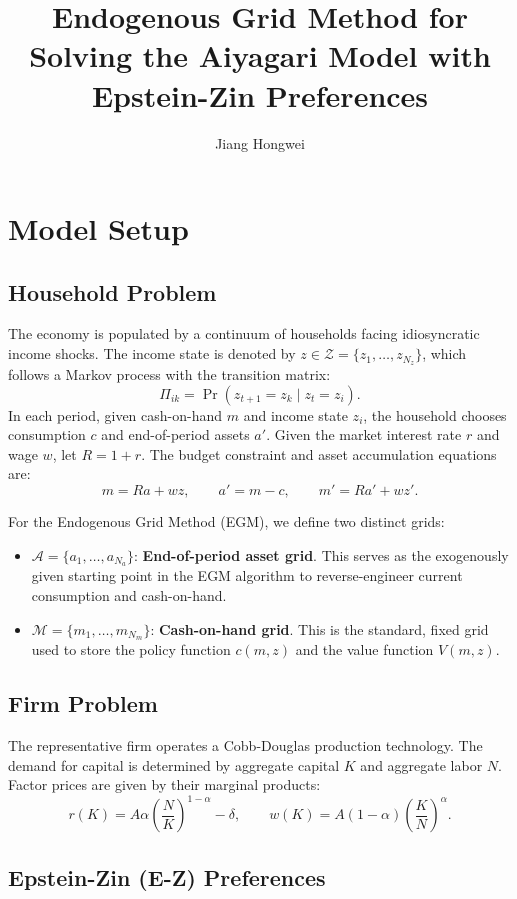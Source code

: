 \documentclass[a4paper,12pt]{article}
\title{Endogenous Grid Method for Solving the Aiyagari Model with Epstein-Zin Preferences}
\author{Jiang Hongwei}
\date{}
\newcommand{\Agrid}{\mathcal{A}}
\newcommand{\Mgrid}{\mathcal{M}}
\newcommand{\Zgrid}{\mathcal{Z}}
\begin{document}
\maketitle

\section{Model Setup}

\subsection{Household Problem}

The economy is populated by a continuum of households facing idiosyncratic income shocks. The income state is denoted by $z\in\Zgrid=\{z_1,\ldots,z_{N_z}\}$, which follows a Markov process with the transition matrix:
\[
    \Pi_{ik}=\Pr(z_{t+1}=z_k\mid z_t=z_i).
\]
In each period, given cash-on-hand $m$ and income state $z_i$, the household chooses consumption $c$ and end-of-period assets $a'$. Given the market interest rate $r$ and wage $w$, let $R=1+r$. The budget constraint and asset accumulation equations are:
\[
    m = R a + w z, \qquad a' = m - c, \qquad m' = R a' + w z'.
\]

For the Endogenous Grid Method (EGM), we define two distinct grids:
\begin{itemize}
    \item $\Agrid=\{a_1,\ldots,a_{N_a}\}$: \textbf{End-of-period asset grid}. This serves as the exogenously given starting point in the EGM algorithm to reverse-engineer current consumption and cash-on-hand.
    \item $\Mgrid=\{m_1,\ldots,m_{N_m}\}$: \textbf{Cash-on-hand grid}. This is the standard, fixed grid used to store the policy function $c(m,z)$ and the value function $V(m,z)$.
\end{itemize}

\subsection{Firm Problem}

The representative firm operates a Cobb-Douglas production technology. The demand for capital is determined by aggregate capital $K$ and aggregate labor $N$. Factor prices are given by their marginal products:
\[
    r(K)=A\alpha\left(\frac{N}{K}\right)^{1-\alpha}-\delta,
    \qquad
    w(K)=A(1-\alpha)\left(\frac{K}{N}\right)^\alpha.
\]

\subsection{Epstein-Zin (E-Z) Preferences}
\end{document}
